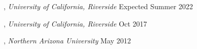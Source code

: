 , \textit{University of California, Riverside}	\hfill Expected Summer 2022

, \textit{University of California, Riverside}	\hfill Oct 2017

, \textit{Northern Arizona University} \hfill	May 2012



